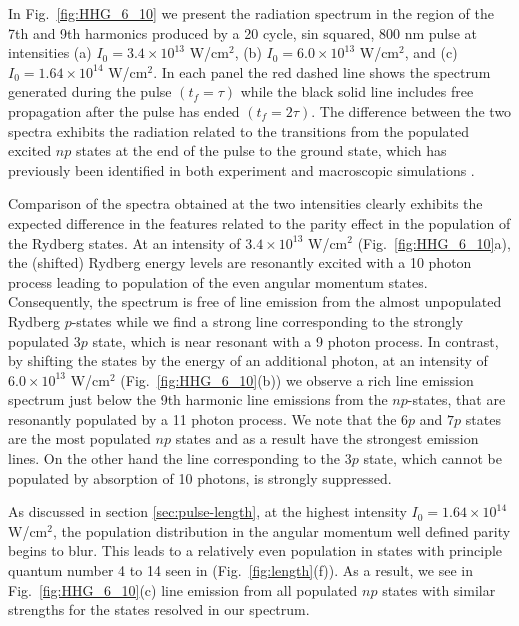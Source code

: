 In Fig.~\ref{fig:HHG_6_10} we present the radiation spectrum in the region of the 7th and 9th harmonics produced by a 20 cycle, sin squared, 800 nm pulse at intensities (a) $I_0 = 3.4\times10^{13}$ W/cm$^2$, (b) $I_0 = 6.0\times10^{13}$ W/cm$^2$, and (c) $I_0 = 1.64\times10^{14}$ W/cm$^2$. In each panel the red dashed line shows the spectrum generated during the pulse $(t_f = \tau)$ while the black solid line includes free propagation after the pulse has ended $(t_f = 2\tau)$. The difference between the two spectra exhibits the radiation related to the transitions from the populated excited $np$ states at the end of the pulse to the ground state, which has previously been identified in both experiment \cite{chini2014} and macroscopic simulations \cite{camp2015,beaulieu2016}.

Comparison of the spectra obtained at the two intensities clearly exhibits the expected difference in the features related to the parity effect in the population of the Rydberg states. At an intensity of $3.4\times10^{13}$ W/cm$^2$ (Fig.~\ref{fig:HHG_6_10}a), the (shifted) Rydberg energy levels are resonantly excited with a 10 photon process leading to population of the even angular momentum states. Consequently, the spectrum is free of line emission from the almost unpopulated Rydberg $p$-states while we find a strong line corresponding to the strongly populated $3p$ state, which is near resonant with a 9 photon process. In contrast, by shifting the states by the energy of an additional photon, at an intensity of $6.0\times10^{13}$ W/cm$^2$ (Fig.~\ref{fig:HHG_6_10}(b)) we observe a rich line emission spectrum just below the 9th harmonic line emissions from the $np$-states, that are resonantly populated by a 11 photon process. We note that the $6p$ and $7p$ states are the most populated $np$ states and as a result have the strongest emission lines. On the other hand the line corresponding to the $3p$ state, which cannot be populated by absorption of 10 photons, is strongly suppressed.

As discussed in section \ref{sec:pulse-length}, at the highest intensity $I_0=1.64\times10^{14}$ W/cm$^2$, the population distribution in the angular momentum well defined parity begins to blur. This leads to a relatively even population in states with principle quantum number 4 to 14 seen in (Fig.~\ref{fig:length}(f)). As a result, we see in Fig.~\ref{fig:HHG_6_10}(c) line emission from all populated $np$ states with similar strengths for the states resolved in our spectrum.


